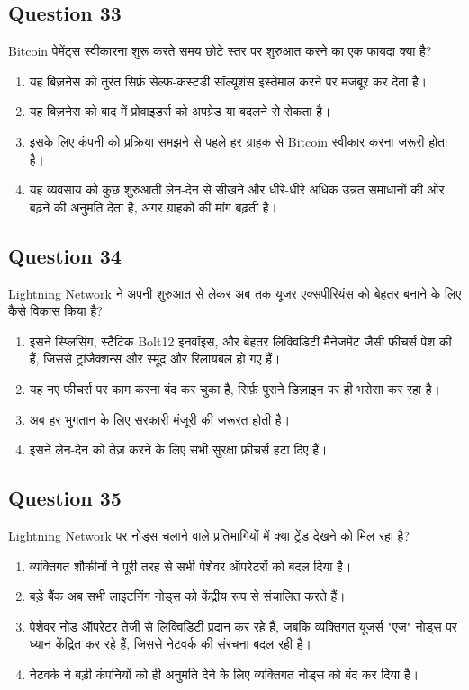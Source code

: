 \documentclass[12pt,a4paper]{article}
\begin{document}
\bigskip


\subsection*{Question 33}
Bitcoin पेमेंट्स स्वीकारना शुरू करते समय छोटे स्तर पर शुरुआत करने का एक फायदा क्या है?

\begin{enumerate}[label=\Alph*., leftmargin=*]
\item यह बिज़नेस को तुरंत सिर्फ़ सेल्फ-कस्टडी सॉल्यूशंस इस्तेमाल करने पर मजबूर कर देता है।
\item यह बिज़नेस को बाद में प्रोवाइडर्स को अपग्रेड या बदलने से रोकता है।
\item इसके लिए कंपनी को प्रक्रिया समझने से पहले हर ग्राहक से Bitcoin स्वीकार करना जरूरी होता है।
\item यह व्यवसाय को कुछ शुरुआती लेन-देन से सीखने और धीरे-धीरे अधिक उन्नत समाधानों की ओर बढ़ने की अनुमति देता है, अगर ग्राहकों की मांग बढ़ती है।
\end{enumerate}

\bigskip


\subsection*{Question 34}
Lightning Network ने अपनी शुरुआत से लेकर अब तक यूजर एक्सपीरियंस को बेहतर बनाने के लिए कैसे विकास किया है?

\begin{enumerate}[label=\Alph*., leftmargin=*]
\item इसने स्प्लिसिंग, स्टैटिक Bolt12 इनवॉइस, और बेहतर लिक्विडिटी मैनेजमेंट जैसी फीचर्स पेश की हैं, जिससे ट्रांजैक्शन्स और स्मूद और रिलायबल हो गए हैं।
\item यह नए फीचर्स पर काम करना बंद कर चुका है, सिर्फ़ पुराने डिज़ाइन पर ही भरोसा कर रहा है।
\item अब हर भुगतान के लिए सरकारी मंजूरी की जरूरत होती है।
\item इसने लेन-देन को तेज़ करने के लिए सभी सुरक्षा फ़ीचर्स हटा दिए हैं।
\end{enumerate}

\bigskip


\subsection*{Question 35}
Lightning Network पर नोड्स चलाने वाले प्रतिभागियों में क्या ट्रेंड देखने को मिल रहा है?

\begin{enumerate}[label=\Alph*., leftmargin=*]
\item व्यक्तिगत शौकीनों ने पूरी तरह से सभी पेशेवर ऑपरेटरों को बदल दिया है।
\item बड़े बैंक अब सभी लाइटनिंग नोड्स को केंद्रीय रूप से संचालित करते हैं।
\item पेशेवर नोड ऑपरेटर तेजी से लिक्विडिटी प्रदान कर रहे हैं, जबकि व्यक्तिगत यूजर्स "एज" नोड्स पर ध्यान केंद्रित कर रहे हैं, जिससे नेटवर्क की संरचना बदल रही है।
\item नेटवर्क ने बड़ी कंपनियों को ही अनुमति देने के लिए व्यक्तिगत नोड्स को बंद कर दिया है।
\end{enumerate}
\end{document}

